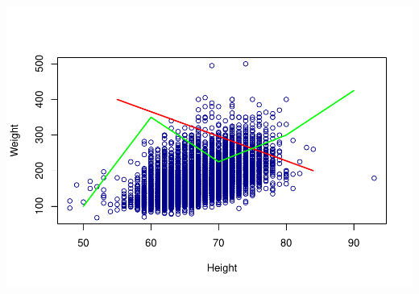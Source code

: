\documentclass[
]{book}
\begin{document}
\includegraphics{_main_files/figure-latex/unnamed-chunk-188-1.pdf}
\end{document}
